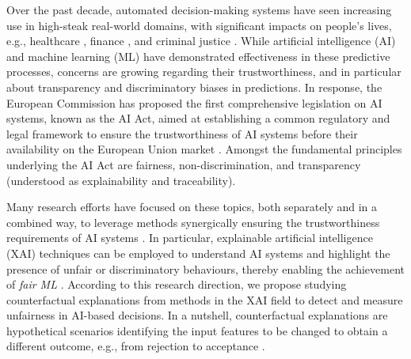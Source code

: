 \documentclass[letterpaper]{article} %
\begin{document}
Over the past decade, automated decision-making systems have seen increasing use in high-steak real-world domains, with significant impacts on people's lives, e.g., healthcare \cite{Morik10}, finance \cite{10.5555/573193}, and criminal justice \cite{angwin2016machine,DBLP:journals/corr/abs-1905-12728}. While artificial intelligence (AI) and machine learning (ML) have demonstrated effectiveness in these predictive processes, concerns are growing regarding their trustworthiness, and in particular about transparency and discriminatory biases in predictions.
%
In response, the European Commission has proposed the first comprehensive legislation on AI systems, known as the AI Act, aimed at establishing a common regulatory and legal framework to ensure the trustworthiness of AI systems before their availability on the European Union market \cite{europeancommission2021}. Amongst the fundamental principles underlying the AI Act are fairness, non-discrimination, and transparency (understood as explainability and traceability).

Many research efforts have focused on these topics, both separately and in a combined way, to leverage methods synergically ensuring the trustworthiness requirements of AI systems \cite{mucsanyi2023trustworthy}.
%
In particular, explainable artificial intelligence (XAI) techniques \cite{8466590} can be employed to understand AI systems and highlight the presence of unfair or discriminatory behaviours, thereby enabling the achievement of \textit{fair ML} \cite{10.1145/3616865}.
%
According to this research direction, we propose studying counterfactual explanations from methods in the XAI field to detect and measure unfairness in AI-based decisions. In a nutshell, counterfactual explanations are hypothetical scenarios identifying the input features to be changed to obtain a different outcome, e.g., from rejection to acceptance \cite{guidotti2022counterfactual,10.1145/3527848}. 
\end{document}
